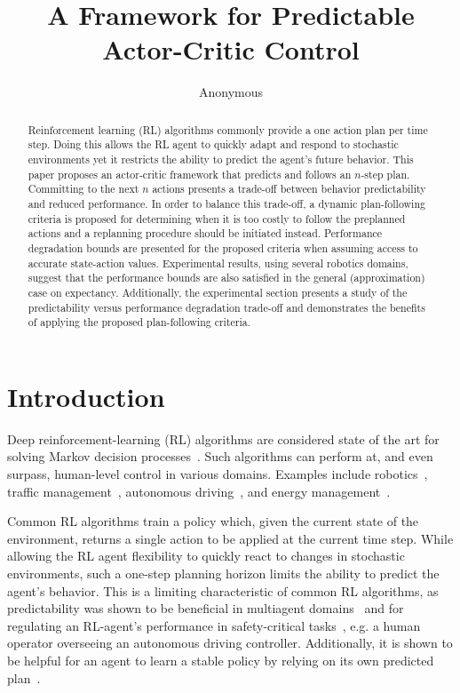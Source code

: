 \documentclass[letterpaper]{article} %
\title{A Framework for Predictable Actor-Critic Control}
\author { 
Anonymous 
}
\begin{document}
    \maketitle
    \begin{abstract}
        Reinforcement learning (RL) algorithms commonly provide a one action plan per time step. Doing this allows the RL agent to quickly adapt and respond to stochastic environments yet it restricts the ability to predict the agent's future behavior. This paper proposes an actor-critic framework that predicts and follows an $n$-step plan. Committing to the next $n$ actions presents a trade-off between behavior predictability and reduced performance. In order to balance this trade-off, a dynamic plan-following criteria is proposed for determining when it is too costly to follow the preplanned actions and a replanning procedure should be initiated instead. 
        Performance degradation bounds are presented for the proposed criteria when assuming access to accurate state-action values. Experimental results, using several robotics domains, suggest that the performance bounds are also satisfied in the general (approximation) case on expectancy. Additionally, the experimental section presents a study of the predictability versus performance degradation trade-off and demonstrates the benefits of applying the proposed plan-following criteria. 
    \end{abstract}

    \section{Introduction}

        Deep reinforcement-learning (RL) algorithms are considered state of the art for solving Markov decision processes~\cite{haarnoja2018soft,schulman2017proximal,mnih2015human}. Such algorithms can perform at, and even surpass, human-level control in various domains. Examples include robotics~\cite{haarnoja2018soft,dey2021jirl}, traffic management~\cite{Ault2021signals,ault2020learning}, autonomous driving~\cite{8793742,sallab2017deep}, and energy management~\cite{gao2014machine,vandael2015reinforcement}. 

        Common RL algorithms train a policy which, given the current state of the environment, returns a single action to be applied at the current time step. While allowing the RL agent flexibility to quickly react to changes in stochastic environments, such a one-step planning horizon limits the ability to predict the agent's behavior. This is a limiting characteristic of common RL algorithms, as predictability was shown to be beneficial in multiagent domains~\cite{wen2019probabilistic,sun2018probabilistic,kim2020communication,das2019tarmac,raileanu2018modeling} and for regulating an RL-agent's performance in safety-critical tasks~\cite{8897630}, e.g. a human operator overseeing an autonomous driving controller. Additionally, it is shown to be helpful for an agent to learn a stable policy by relying on its own predicted plan~\cite{racaniere2017imagination}.
\end{document}
